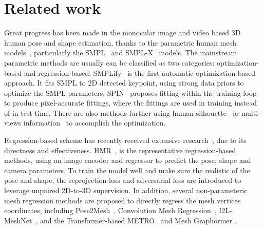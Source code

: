 \section{Related work}

Great progress has been made in the monocular image and video based 3D human pose and shape estimation, thanks to the parametric human mesh models~\citep{smpl:loper2015smpl, smpl-x:pavlakos2019expressive,frank:joo2018total}, particularly the SMPL~\citep{smpl:loper2015smpl} and SMPL-X~\citep{smpl-x:pavlakos2019expressive} models. 
The mainstream parametric methods are usually can be classified as two categories: optimization-based and regression-based.  SMPLify~\citep{smplify:bogo2016keep} is the first automatic optimization-based approach. It fits SMPL to 2D detected keypoint, using strong data priors to optimize the SMPL parameters. SPIN~\citep{spin:kolotouros2019learning} proposes fitting within the training loop to produce pixel-accurate fittings, where the fittings are used in training instead of in test time.
There are also methods further using human silhouette~\citep{unite:lassner2017unite} or multi-views information~\citep{huang2017towards} to accomplish the optimization. 

Regression-based scheme has recently received extensive research~\citep{hmr:kanazawa2018end, hmmr:kanazawa2019learning, vibe:kocabas2020vibe, skeleton-disentangled:sun2019human, sim2real:doersch2019sim2real, tcmr:choi2021beyond, metro:lin2021end,  meshgrahormer:lin2021mesh}, due to its directness and effectiveness. HMR~\citep{hmr:kanazawa2018end}, is the representative regression-based methods, using an image encoder and regressor to predict the pose, shape and camera parameters. To train the model well and make sure the realistic of the pose and shape, the reprojection loss and adversarial loss are introduced to leverage unpaired 2D-to-3D supervision. 
In addition, several non-parameteric mesh regression methods are proposed to directly regress the mesh vertices coordinates, including Pose2Mesh~\citep{pose2mesh:choi2020pose2mesh}, Convolution Mesh Regression~\citep{meshregression:kolotouros2019convolutional}, I2L-MeshNet~\citep{i2l-meshnet:moon2020i2l}, and the Transformer-based METRO~\citep{metro:lin2021end} and Mesh Graphormer~\citep{meshgrahormer:lin2021mesh}. 

